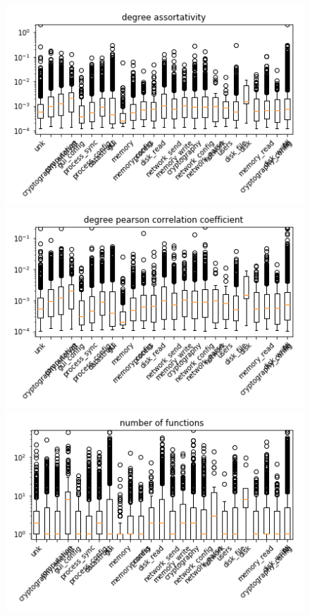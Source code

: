 \begin{appendices}
\begin{figure}[H]
\vfill


%
\centering
\includegraphics[width=0.9\linewidth]{img/boxplots/v3_unbalanced_degree_assortativity.png}
\endminipage
{}%
\centering
\includegraphics[width=0.9\linewidth]{img/boxplots/v3_unbalanced_degree_pearson_correlation_coefficient.png}
\endminipage
{}%
\centering
\includegraphics[width=0.9\linewidth]{img/boxplots/v3_unbalanced_number_of_functions.png}
\endminipage


\end{figure}
\end{appendices}
